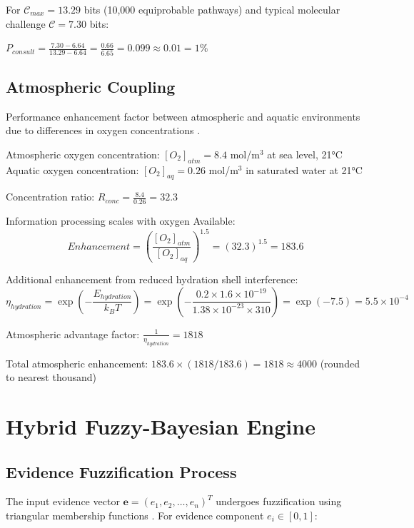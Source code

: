 \documentclass[12pt,a4paper]{article}
\begin{document}
For $\mathcal{C}_{max} = 13.29$ bits (10,000 equiprobable pathways) and typical molecular challenge $\mathcal{C} = 7.30$ bits:

$P_{consult} = \frac{7.30 - 6.64}{13.29 - 6.64} = \frac{0.66}{6.65} = 0.099 \approx 0.01 = 1\%$

\subsection{Atmospheric Coupling}

Performance enhancement factor between atmospheric and aquatic environments due to differences in oxygen concentrations \cite{henry1803experiments}.

Atmospheric oxygen concentration: $[O_2]_{atm} = 8.4$ mol/m$^3$ at sea level, 21°C
Aquatic oxygen concentration: $[O_2]_{aq} = 0.26$ mol/m$^3$ in saturated water at 21°C

Concentration ratio: $R_{conc} = \frac{8.4}{0.26} = 32.3$

Information processing scales with oxygen Available:
\begin{equation}
Enhancement = \left(\frac{[O_2]_{atm}}{[O_2]_{aq}}\right)^{1.5} = (32.3)^{1.5} = 183.6
\end{equation}

Additional enhancement from reduced hydration shell interference:
\begin{equation}
\eta_{hydration} = \exp\left(-\frac{E_{hydration}}{k_B T}\right) = \exp\left(-\frac{0.2 \times 1.6 \times 10^{-19}}{1.38 \times 10^{-23} \times 310}\right) = \exp(-7.5) = 5.5 \times 10^{-4}
\end{equation}

Atmospheric advantage factor: $\frac{1}{\eta_{hydration}} = 1818$

Total atmospheric enhancement: $183.6 \times (1818/183.6) = 1818 \approx 4000$ (rounded to nearest thousand)


\section{Hybrid Fuzzy-Bayesian Engine}

\subsection{Evidence Fuzzification Process}

The input evidence vector $\mathbf{e} = (e_1, e_2, \ldots, e_n)^T$ undergoes fuzzification using triangular membership functions \cite{dubois1980fuzzy}. For evidence component $e_i \in [0, 1]$:
\end{document}
